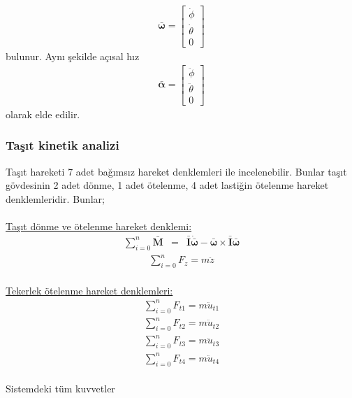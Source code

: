 \documentclass[a4paper]{report}
\begin{document}
\begin{eqnarray*}
\mathbf{{\bar{{\omega}}}}=\left[ \begin{array}{c}\dot{\phi} \\ \dot{\theta} \\0\end{array}\right]
\end{eqnarray*}
bulunur. Aynı şekilde açısal hız 
\begin{eqnarray*}
\mathbf{{\bar{{\alpha}}}}=\left[ \begin{array}{c}\ddot{\phi} \\ \ddot{\theta} \\0\end{array}\right]
\end{eqnarray*}
olarak elde edilir.
\subsubsection*{Taşıt kinetik analizi}
Taşıt hareketi 7 adet bağımsız hareket denklemleri ile incelenebilir. Bunlar taşıt gövdesinin 2 adet dönme, 1 adet ötelenme, 4 adet lastiğin ötelenme hareket denklemleridir. Bunlar;\\ \\
\underline{Taşıt dönme ve ötelenme hareket denklemi:}
\begin{eqnarray*}
\sum_{i=0}^{n} \mathbf{ \bar{M}} &=& \mathbf{\bar{I}} \dot{\mathbf{\bar{ \omega}}} - {\mathbf{\bar {\omega}}} \times \mathbf{\bar{I}} \mathbf{\bar{ \omega}}
\end{eqnarray*}
\begin{eqnarray*}
\sum_{i=0}^{n} F_z = m \ddot{z}
\end{eqnarray*}\\
\underline{Tekerlek ötelenme hareket denklemleri:}
\begin{eqnarray*}
\sum_{i=0}^{n} F_{t1} = m \ddot{u}_{t1}\\
\sum_{i=0}^{n} F_{t2} = m \ddot{u}_{t2}\\
\sum_{i=0}^{n} F_{t3} = m \ddot{u}_{t3}\\
\sum_{i=0}^{n} F_{t4} = m \ddot{u}_{t4}
\end{eqnarray*}\\
Sistemdeki tüm kuvvetler
\end{document}
